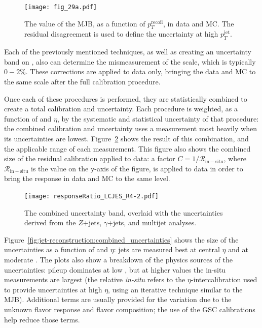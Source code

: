 
\begin{figure}
\centering
\texttt{[image: fig\_29a.pdf]}
\caption{The value of the MJB, as a function of $p_T^\mathrm{recoil}$, in data and MC. The residual disagreement is used to define the uncertainty at high $p_T^\mathrm{jet}$.}
\label{fig:jet-reconstruction:mjb}
\end{figure}



Each of the previously mentioned techniques, as well as creating an uncertainty band on \pt, also can determine the mismeasurement of the scale, which is typically $0-2\%$. These corrections are applied to data only, bringing the data and MC to the same scale after the full calibration procedure.

Once each of these procedures is performed, they are statistically combined to create a total calibration and uncertainty. Each procedure is weighted, as a function of \pt and $\eta$, by the systematic and statistical uncertainty of that procedure: the combined calibration and uncertainty uses a measurement most heavily when its uncertainties are lowest. Figure~\ref{fig:jet-reconstruction:combined_jes} shows the result of this combination, and the applicable range of each measurement. This figure also shows the combined size of the residual calibration applied to data: a factor $C = 1/\mathcal{R}_\mathrm{in-situ}$, where $\mathcal{R}_\mathrm{in-situ}$ is the value on the y-axis of the figure, is applied to data in order to bring the response in data and MC to the same level.


\begin{figure}
\centering
\texttt{[image: responseRatio\_LCJES\_R4-2.pdf]}
\caption{The combined uncertainty band, overlaid with the uncertainties derived from the $Z$+jets, $\gamma$+jets, and multijet analyses.}
\label{fig:jet-reconstruction:combined_jes}
\end{figure}


Figure~\ref{fig:jet-reconstruction:combined_uncertainties} shows the size of the uncertainties as a function of \pt and $\eta$: jets are measured best at central $\eta$ and at moderate \pt. The plots also show a breakdown of the physics sources of the uncertainties: pileup dominates at low \pt, but at higher values the in-situ measurements are largest (the relative \textit{in-situ} refers to the $\eta$-intercalibration used to provide uncertainties at high $\eta$, using an iterative technique similar to the MJB). Additional terms are usually provided for the variation due to the unknown flavor response and flavor composition; the use of the GSC calibrations help reduce those terms.

